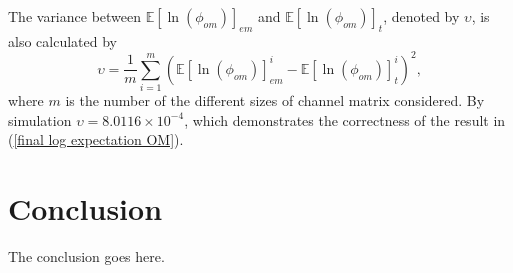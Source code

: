 \documentclass[12pt, draftclsnofoot, onecolumn]{IEEEtran}
\begin{document}
The variance between $\mathbb{E}[\ln(\phi_{om})]_{em}$ and $\mathbb{E}[\ln(\phi_{om})]_{t}$, denoted by $\upsilon$, is also calculated by \begin{equation}
\upsilon=\frac{1}{m}\sum_{i=1}^{m}(\mathbb{E}[\ln(\phi_{om})]^{i}_{em}-\mathbb{E}[\ln(\phi_{om})]^{i}_{t})^{2},
\label{variance OM}
\end{equation} 
where $m$ is the number of the different sizes of channel matrix considered. By simulation $\upsilon=8.0116\times 10^{-4}$, which demonstrates the correctness of the result in (\ref{final log expectation OM}).


\section{Conclusion}
The conclusion goes here.
\newpage





%
\end{document}
